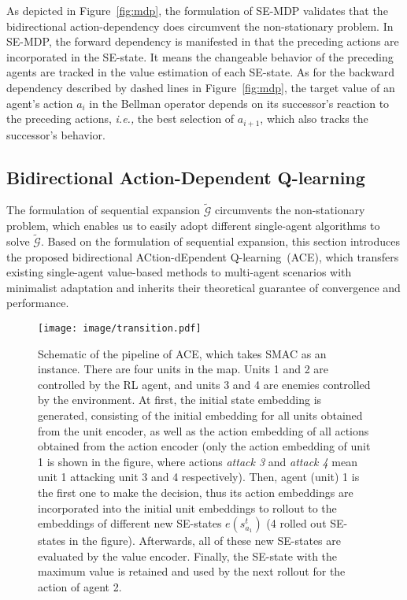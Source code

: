\documentclass[letterpaper]{article} \usepackage{aaai23}  \usepackage{times}  \usepackage{helvet}  \usepackage{courier}  \usepackage[hyphens]{url}  \usepackage{graphicx} \urlstyle{rm} \def\UrlFont{\rm}  \usepackage{natbib}  \usepackage{caption} \frenchspacing  \setlength{\pdfpagewidth}{8.5in} \setlength{\pdfpageheight}{11in} \usepackage{algorithm}
\begin{document}
As depicted in Figure~\ref{fig:mdp}, the formulation of SE-MDP validates that the bidirectional action-dependency does circumvent the non-stationary problem. In SE-MDP, the forward dependency is manifested in that the preceding actions are incorporated in the SE-state. It means the changeable behavior of the preceding agents are tracked in the value estimation of each SE-state. As for the backward dependency described by dashed lines in Figure~\ref{fig:mdp}, the target value of an agent's action $a_i$ in the Bellman operator depends on its successor's reaction to the preceding actions, \textit{i.e.,} the best selection of $a_{i+1}$, which also tracks the successor's behavior.

\subsection{Bidirectional Action-Dependent Q-learning}
\vspace{-0.5ex}
The formulation of sequential expansion $\widetilde{\mathcal{G}}$ circumvents the non-stationary problem, which enables us to easily adopt different single-agent algorithms to solve $\widetilde{\mathcal{G}}$. Based on the formulation of sequential expansion, this section introduces the proposed bidirectional ACtion-dEpendent Q-learning~(ACE), which transfers existing single-agent value-based methods to multi-agent scenarios with minimalist adaptation and inherits their theoretical guarantee of convergence and performance.

\begin{figure*}[t]
    \centering
    \texttt{[image: image/transition.pdf]}
\vspace{-2ex}
    \caption{Schematic of the pipeline of ACE, which takes SMAC as an instance. There are four units in the map. Units 1 and 2 are controlled by the RL agent, and units 3 and 4 are enemies controlled by the environment. At first, the initial state embedding is generated, consisting of the initial embedding for all units obtained from the unit encoder, as well as the action embedding of all actions obtained from the action encoder (only the action embedding of unit 1 is shown in the figure, where actions \emph{attack 3} and \emph{attack 4} mean unit 1 attacking unit 3 and 4 respectively). Then, agent (unit) 1 is the first one to make the decision, thus its action embeddings are incorporated into the initial unit embeddings to rollout to the embeddings of different new SE-states $e\left(s_{a_1}^t\right)$ (4 rolled out SE-states in the figure). Afterwards, all of these new SE-states are evaluated by the value encoder. Finally, the SE-state with the maximum value is retained and used by the next rollout for the action of agent 2.}
\vspace{-4ex}
    \label{fig:transition}
\end{figure*}
\end{document}

